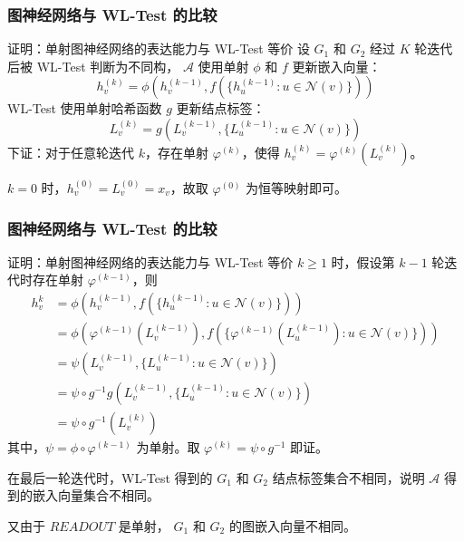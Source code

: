 \documentclass{beamer}
\begin{document}
\begin{frame}

  \frametitle{图神经网络与 WL-Test 的比较}
  \begin{block}{证明：单射图神经网络的表达能力与 WL-Test 等价}
    设 $G_1$ 和 $G_2$ 经过 $K$ 轮迭代后被 WL-Test 判断为不同构，
    $\mathcal{A}$ 使用单射 $\phi$ 和 $f$ 更新嵌入向量：
    $$ h_v^{(k)} = \phi(h_v^{(k-1)}, f(\{h_u^{(k-1)} : u \in \mathcal{N}(v)\})) $$
    WL-Test 使用单射哈希函数 $g$ 更新结点标签：
    $$ L_v^{(k)} = g(L_v^{(k-1)}, \{L_u^{(k-1)} : u \in \mathcal{N}(v)\}) $$
    下证：对于任意轮迭代 $k$，存在单射 $\varphi^{(k)}$，使得 $h_v^{(k)} = \varphi^{(k)}(L_v^{(k)})$。

    $k = 0$ 时，$h_v^{(0)} = L_v^{(0)} = x_v$，故取 $\varphi^{(0)}$ 为恒等映射即可。

  \end{block}

\end{frame}

\begin{frame}

  \frametitle{图神经网络与 WL-Test 的比较}
  \begin{block}{证明：单射图神经网络的表达能力与 WL-Test 等价}
    $k \ge 1$ 时，假设第 $k - 1$ 轮迭代时存在单射 $\varphi^{(k-1)}$，则
    \begin{align*}
      h_v^k &= \phi(h_v^{(k-1)}, f(\{h_u^{(k-1)} : u \in \mathcal{N}(v)\})) \\
            &= \phi(\varphi^{(k-1)}(L_v^{(k-1)}), f(\{\varphi^{(k-1)}(L_u^{(k-1)}) : u \in \mathcal{N}(v)\})) \\
            &= \psi(L_v^{(k-1)}, \{L_u^{(k-1)} : u \in \mathcal{N}(v)\}) \\
            &= \psi \circ g^{-1} g (L_v^{(k-1)}, \{L_u^{(k-1)} : u \in \mathcal{N}(v)\}) \\
            &= \psi \circ g^{-1}(L_v^{(k)})
    \end{align*}
    其中，$\psi = \phi \circ \varphi^{(k-1)}$ 为单射。取 $\varphi^{(k)} = \psi \circ g^{-1}$ 即证。
    
    在最后一轮迭代时，WL-Test 得到的 $G_1$ 和 $G_2$ 结点标签集合不相同，说明 $\mathcal{A}$ 得到的嵌入向量集合不相同。
    
    又由于 $READOUT$ 是单射， $G_1$ 和 $G_2$ 的图嵌入向量不相同。
  \end{block}

\end{frame}
\end{document}
